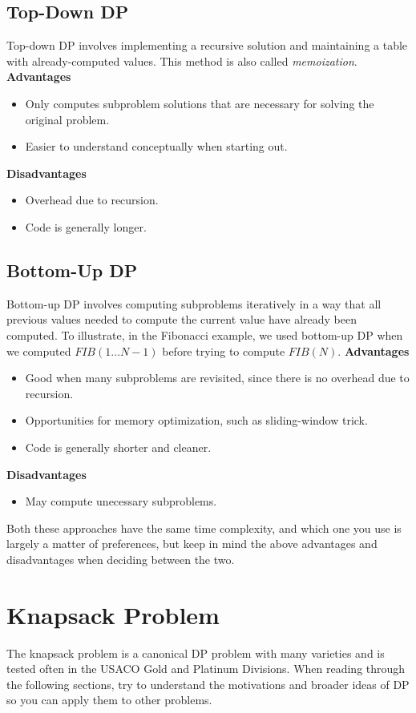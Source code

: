\documentclass{article}
\newcommand{\nl}[]{\newline}
\begin{document}
\subsection{Top-Down DP}
Top-down DP involves implementing a recursive solution and maintaining a table with already-computed values. This method is also called \emph{memoization}.\nl\nl
\textbf{Advantages}
\begin{itemize}
    \item Only computes subproblem solutions that are necessary for solving the original problem.
    \item Easier to understand conceptually when starting out.
\end{itemize}
\textbf{Disadvantages}
\begin{itemize}
    \item Overhead due to recursion.
    \item Code is generally longer.
\end{itemize}
\subsection{Bottom-Up DP}
Bottom-up DP involves computing subproblems iteratively in a way that all previous values needed to compute the current value have already been computed. To illustrate, in the Fibonacci example, we used bottom-up DP when we computed $FIB(1\ldots N - 1)$ before trying to compute $FIB(N)$.\nl\nl
\textbf{Advantages}
\begin{itemize}
    \item Good when many subproblems are revisited, since there is no overhead due to recursion.
    \item Opportunities for memory optimization, such as sliding-window trick.
    \item Code is generally shorter and cleaner.
\end{itemize}
\textbf{Disadvantages}
\begin{itemize}
    \item May compute unecessary subproblems.
\end{itemize}
Both these approaches have the same time complexity, and which one you use is largely a matter of preferences, but keep in mind the above advantages and disadvantages when deciding between the two.
\section{Knapsack Problem}
The knapsack problem is a canonical DP problem with many varieties and is tested often in the USACO Gold and Platinum Divisions. When reading through the following sections, try to understand the motivations and broader ideas of DP so you can apply them to other problems.
\end{document}
